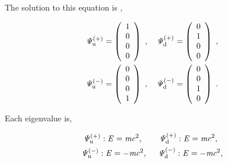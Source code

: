 \documentclass[%
 reprint,
 amsmath,amssymb,
 aps,
]{revtex4-1}
\numberwithin{equation}{section}%
\begin{document}
    The solution to this equation is \cite{Griffiths},


        \begin{align}
            \it\Psi^{(+)}_{\mathrm{u}}
            =
            \left( 
                \begin{array}{c}
                    1 \\
                    0 \\
                    0 \\
                    0 \\
                \end{array}
            \right) \
            , \ \ \
            \it\Psi^{(+)}_{\mathrm{d}}
            =
            \left( 
                \begin{array}{c}
                    0 \\
                    1 \\
                    0 \\
                    0 \\
                \end{array}
            \right) \
            \notag
            ,
            \\
            \it\Psi^{(-)}_{\mathrm{u}}
            =
            \left( 
                \begin{array}{c}
                    0 \\
                    0 \\
                    0 \\
                    1 \\
                \end{array}
            \right) \
            , \ \ \
            \it\Psi^{(-)}_{\mathrm{d}}
            =
            \left( 
                \begin{array}{c}
                    0 \\
                    0 \\
                    1 \\
                    0 \\
                \end{array}
            \right) \
            .
        \label{e_Psy_4}
        \end{align}

    Each eigenvalue is,

        \begin{align}
            \it\Psi^{(+)}_{\mathrm{u}} : E = m c \mathrm{^2}, \ \ \ \ \ \ \it\Psi^{(+)}_{\mathrm{d}} : E = m c \mathrm{^2}, \ \
            \notag
            \\
            \it\Psi^{(-)}_{\mathrm{u}} : E = - m c \mathrm{^2}, \ \ \ \ \it\Psi^{(-)}_{\mathrm{d}} : E = - m c \mathrm{^2},
        \label{e_Psy_5}
        \end{align}
\end{document}
